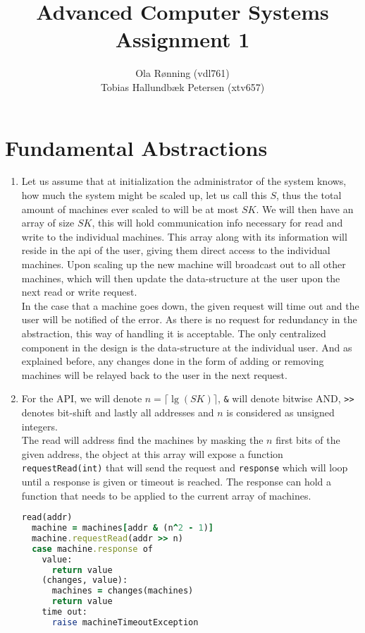 \documentclass[a4paper]{article}
\author{Ola Rønning (vdl761) \\ Tobias Hallundbæk Petersen (xtv657)}
\title{Advanced Computer Systems \\ Assignment 1}
\begin{document}
\maketitle
\section{Fundamental Abstractions}
\begin{enumerate}
  \item Let us assume that at initialization the administrator of the system knows, how much the system might be scaled up, let us call this $S$, thus the total amount of machines ever scaled to will be at most $SK$. We will then have an array of size $SK$, this will hold communication info necessary for read and write to the individual machines. This array along with its information will reside in the api of the user, giving them direct access to the individual machines. Upon scaling up the new machine will broadcast out to all other machines, which will then update the data-structure at the user upon the next read or write request.\\
    In the case that a machine goes down, the given request will time out and the user will be notified of the error. As there is no request for redundancy in the abstraction, this way of handling it is acceptable.
    The only centralized component in the design is the data-structure at the individual user. And as explained before, any changes done in the form of adding or removing machines will be relayed back to the user in the next request.
  \item For the API, we will denote $n = \lceil \lg (SK) \rceil$, \texttt{\&} will denote bitwise AND, \texttt{>>} denotes bit-shift and lastly all addresses and $n$ is considered as unsigned integers.\\
    The read will address find the machines by masking the $n$ first bits of the given address, the object at this array will expose a function \texttt{requestRead(int)} that will send the request and \texttt{response} which will loop until a response is given or timeout is reached. The response can hold a function that needs to be applied to the current array of machines.
    \begin{lstlisting}[language=Ruby, caption={READ}]
read(addr)
  machine = machines[addr & (n^2 - 1)]
  machine.requestRead(addr >> n)
  case machine.response of
    value:
      return value
    (changes, value):
      machines = changes(machines)
      return value
    time out:
      raise machineTimeoutException

\end{lstlisting}
\end{enumerate}
\end{document}

